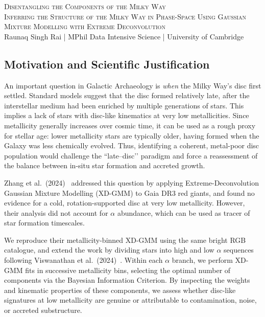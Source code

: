 \documentclass[a4paper,10pt]{article}
\begin{document}
\begin{center}
    {\Large \textsc{Disentangling the Components of the Milky Way}}\\[0.2cm]
    {\textsc{Inferring the Structure of the Milky Way in Phase-Space Using Gaussian Mixture Modelling with Extreme Deconvolution}}\\[0.2cm]
    Raunaq Singh Rai \quad | \quad MPhil Data Intensive Science \quad | \quad University of Cambridge
\end{center}

\begin{multicols}{2}

\section*{Motivation and Scientific Justification}

An important question in Galactic Archaeology is \emph{when} the Milky Way’s disc first settled.  
Standard models suggest that the disc formed relatively late, after the interstellar medium had been enriched by multiple generations of stars. 
This implies a lack of stars with disc-like kinematics at very low metallicities. 
Since metallicity generally increases over cosmic time, it can be used as a rough proxy for stellar age: lower metallicity stars are typically older, having formed when the Galaxy was less chemically evolved. 
Thus, identifying a coherent, metal-poor disc population would challenge the “late–disc’’ paradigm and force a reassessment of the balance between in-situ star formation and accreted growth.

Zhang et al.\ (2024)~\cite{zhang2024existencemetalpoordiscmilky} addressed this question by applying Extreme-Deconvolution Gaussian Mixture Modelling (XD-GMM) to Gaia DR3 red giants, and found no evidence for a cold, rotation-supported disc at very low metallicity.  
However, their analysis did not account for $\alpha$ abundance, which can be used as tracer of star formation timescales.

We reproduce their metallicity-binned XD-GMM using the same bright RGB catalogue, and extend the work by dividing stars into high and low $\alpha$ sequences following Viswanathan et al.\ (2024)~\cite{Vis2024}.  
Within each $\alpha$ branch, we perform XD-GMM fits in successive metallicity bins, selecting the optimal number of components via the Bayesian Information Criterion.  
By inspecting the weights and kinematic properties of these components, we assess whether disc-like signatures at low metallicity are genuine or attributable to contamination, noise, or accreted substructure.


\end{multicols}
\end{document}

